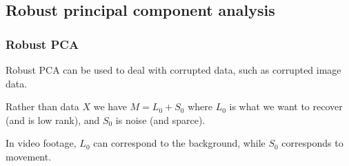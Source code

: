 
\subsection{Robust principal component analysis}

\subsubsection{Robust PCA}

Robust PCA can be used to deal with corrupted data, such as corrupted image data.

Rather than data \(X\) we have \(M=L_0+S_0\) where \(L_0\) is what we want to recover (and is low rank), and \(S_0\) is noise (and sparce).	

In video footage, \(L_0\) can correspond to the background, while \(S_0\) corresponds to movement.

